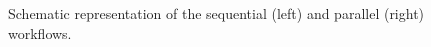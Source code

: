 \begin{figure}[!htp]
	\begin{center}
		\caption{Schematic representation of the \ttDilepKinFit sequential (left) and parallel (right) workflows.}
		\label{fig:SeqPipeline}
	\end{center}
\end{figure}

